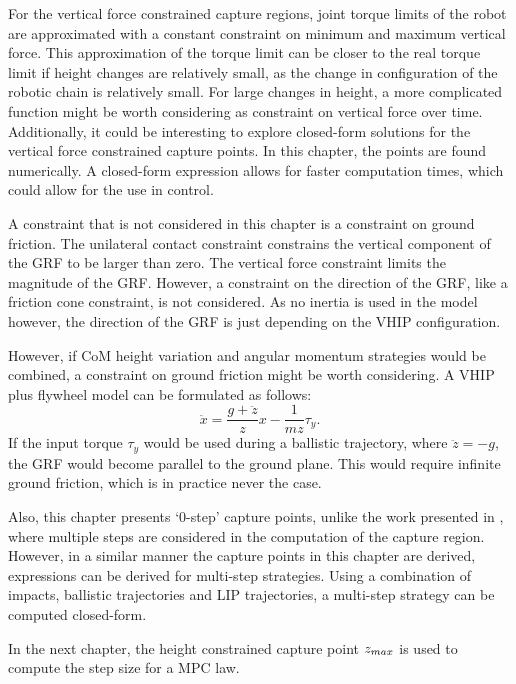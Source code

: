 For the vertical force constrained capture regions, joint torque limits of the robot are approximated with a constant constraint on minimum and maximum vertical force. This approximation of the torque limit can be closer to the real torque limit if height changes are relatively small, as the change in configuration of the robotic chain is relatively small. For large changes in height, a more complicated function might be worth considering as constraint on vertical force over time. Additionally, it could be interesting to explore closed-form solutions for the vertical force constrained capture points. In this chapter, the points are found numerically. A closed-form expression allows for faster computation times, which could allow for the use in control.

A constraint that is not considered in this chapter is a constraint on ground friction. The unilateral contact constraint constrains the vertical component of the \ac{GRF} to be larger than zero. The vertical force constraint limits the magnitude of the \ac{GRF}. However, a constraint on the direction of the \ac{GRF}, like a friction cone constraint, is not considered. As no inertia is used in the model however, the direction of the \ac{GRF} is just depending on the \ac{VHIP} configuration.

However, if \ac{CoM} height variation and angular momentum strategies would be combined, a constraint on ground friction might be worth considering.  A \ac{VHIP} plus flywheel model can be formulated as follows:
\begin{equation}
 \ddot{x} = \frac{g+\ddot{z}}{z}x - \frac{1}{mz}\tau_y.
\end{equation}
If the input torque $\tau_y$ would be used during a ballistic trajectory, where $\ddot{z}=-g$, the \ac{GRF} would become parallel to the ground plane. This would require infinite ground friction, which is in practice never the case.

Also, this chapter presents `0-step' capture points, unlike the work presented in \cite{koolen2012capturability, gao2017increase}, where multiple steps are considered in the computation of the capture region. However, in a similar manner the capture points in this chapter are derived, expressions can be derived for multi-step strategies. Using a combination of impacts, ballistic trajectories and \ac{LIP} trajectories, a multi-step strategy can be computed closed-form.

In the next chapter, the height constrained capture point $z_{max}$ is used to compute the step size for a \ac{MPC} law.